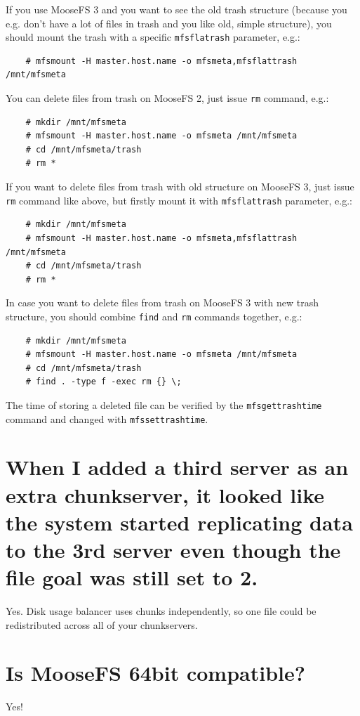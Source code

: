 \documentclass[a4paper,11pt,english]{report}
\def\code#1{\texttt{#1}}
\begin{document}
		If you use MooseFS 3 and you want to see the old trash structure (because you e.g. don't have a lot of files in trash and you like old, simple structure), you should mount the trash with a specific \code{mfsflatrash} parameter, e.g.:
		\begin{lstlisting}
	# mfsmount -H master.host.name -o mfsmeta,mfsflattrash /mnt/mfsmeta
		\end{lstlisting}
		
		You can delete files from trash on MooseFS 2, just issue \code{rm} command, e.g.:
		
		\begin{lstlisting}
	# mkdir /mnt/mfsmeta
	# mfsmount -H master.host.name -o mfsmeta /mnt/mfsmeta
	# cd /mnt/mfsmeta/trash
	# rm *
		\end{lstlisting}
		
		If you want to delete files from trash with old structure on MooseFS 3, just issue \code{rm} command like above, but firstly mount it with \code{mfsflattrash} parameter, e.g.:
		
		\begin{lstlisting}
	# mkdir /mnt/mfsmeta
	# mfsmount -H master.host.name -o mfsmeta,mfsflattrash /mnt/mfsmeta
	# cd /mnt/mfsmeta/trash
	# rm *
		\end{lstlisting}
		
		In case you want to delete files from trash on MooseFS 3 with new trash structure, you should combine \code{find} and \code{rm} commands together, e.g.:
		
		\begin{lstlisting}
	# mkdir /mnt/mfsmeta
	# mfsmount -H master.host.name -o mfsmeta /mnt/mfsmeta
	# cd /mnt/mfsmeta/trash
	# find . -type f -exec rm {} \;
		\end{lstlisting}
		
		
		The time of storing a deleted file can be verified by the \code{mfsgettrashtime} command and changed with \code{mfssettrashtime}.
		
		
		\section{When I added a third server as an extra chunkserver, it looked like the system started replicating data to the 3rd server even though the file goal was still set to 2.}
		Yes. Disk usage balancer uses chunks independently, so one file could be redistributed across all of your chunkservers.
		
		
		\section{Is MooseFS 64bit compatible?}
		Yes!
		
\end{document}
